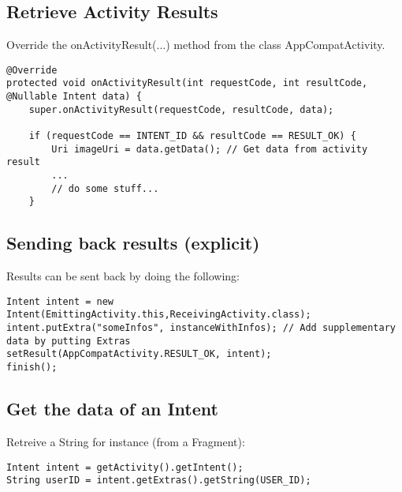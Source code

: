 \documentclass[11pt]{article}
\begin{document}
\subsection{Retrieve Activity Results}
Override the onActivityResult(...) method from the class AppCompatActivity. 
\lstset{language = Java}
\begin{lstlisting}
@Override
protected void onActivityResult(int requestCode, int resultCode, @Nullable Intent data) {
    super.onActivityResult(requestCode, resultCode, data);

    if (requestCode == INTENT_ID && resultCode == RESULT_OK) {
        Uri imageUri = data.getData(); // Get data from activity result
        ...
        // do some stuff...
    }
\end{lstlisting}

\subsection{Sending back results (explicit)}
Results can be sent back by doing the following: 
\lstset{language = Java}
\begin{lstlisting}
Intent intent = new Intent(EmittingActivity.this,ReceivingActivity.class);
intent.putExtra("someInfos", instanceWithInfos); // Add supplementary data by putting Extras
setResult(AppCompatActivity.RESULT_OK, intent);
finish();
\end{lstlisting}

\subsection{Get the data of an Intent}
Retreive a String for instance (from a Fragment): 
\lstset{language = Java}
\begin{lstlisting}
Intent intent = getActivity().getIntent();
String userID = intent.getExtras().getString(USER_ID);
\end{lstlisting}
\end{document}
